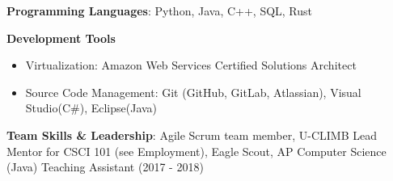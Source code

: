 \vspace{-2.0mm}


\begin{cventries}
\vspace{-5mm}
  \cventry
    {}
    {}
    {}
    {}
    {
      \begin{cvitems}
        \item {\textbf{Programming Languages}: Python, Java, C++,
    SQL, Rust}
        \item {\textbf{Development Tools}}
        \begin{itemize}
        \item {Virtualization: Amazon Web Services
            Certified Solutions Architect}
        \item {Source Code Management: Git (GitHub, GitLab, Atlassian),
            Visual Studio(C\#), Eclipse(Java)}
        \end {itemize}
        \item {\textbf{Team Skills \& Leadership}: Agile Scrum team
            member, U-CLIMB Lead Mentor for CSCI 101 (see Employment),
    Eagle Scout, AP Computer Science (Java) Teaching Assistant (2017 -
    2018)}
      \end{cvitems}
    }
\end{cventries}
